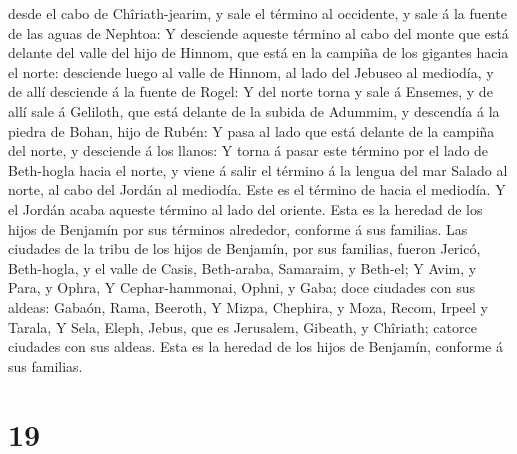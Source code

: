 desde el cabo de Chîriath-jearim, y sale el término al occidente, y sale
á la fuente de las aguas de Nephtoa:  Y desciende aqueste
término al cabo del monte que está delante del valle del hijo de Hinnom,
que está en la campiña de los gigantes hacia el norte: desciende luego
al valle de Hinnom, al lado del Jebuseo al mediodía, y de allí desciende
á la fuente de Rogel:  Y del norte torna y sale á
Ensemes, y de allí sale á Geliloth, que está delante de la subida de
Adummim, y descendía á la piedra de Bohan, hijo de Rubén:
 Y pasa al lado que está delante de la campiña del norte,
y desciende á los llanos:  Y torna á pasar este término
por el lado de Beth-hogla hacia el norte, y viene á salir el término á
la lengua del mar Salado al norte, al cabo del Jordán al mediodía. Este
es el término de hacia el mediodía.  Y el Jordán acaba
aqueste término al lado del oriente. Esta es la heredad de los hijos de
Benjamín por sus términos alrededor, conforme á sus familias.
 Las ciudades de la tribu de los hijos de Benjamín, por
sus familias, fueron Jericó, Beth-hogla, y el valle de Casis,
 Beth-araba, Samaraim, y Beth-el;  Y Avim,
y Para, y Ophra,  Y Cephar-hammonai, Ophni, y Gaba; doce
ciudades con sus aldeas:  Gabaón, Rama, Beeroth,
 Y Mizpa, Chephira, y Moza,  Recom, Irpeel
y Tarala,  Y Sela, Eleph, Jebus, que es Jerusalem,
Gibeath, y Chîriath; catorce ciudades con sus aldeas. Esta es la heredad
de los hijos de Benjamín, conforme á sus familias.

\hypertarget{section-18}{%
\section{19}\label{section-18}}

